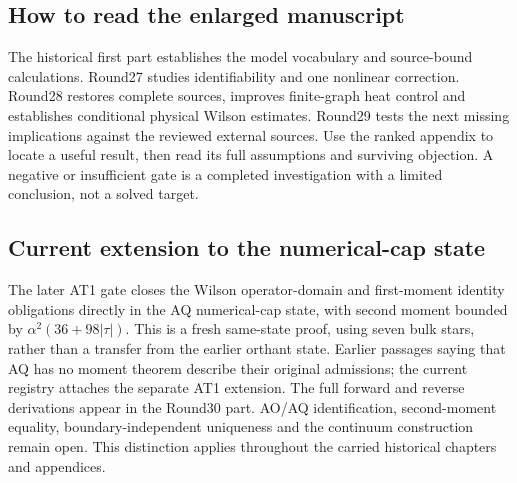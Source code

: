 \subsection{How to read the enlarged manuscript}
The historical first part establishes the model vocabulary and source-bound calculations. Round27 studies identifiability and one nonlinear correction. Round28 restores complete sources, improves finite-graph heat control and establishes conditional physical Wilson estimates. Round29 tests the next missing implications against the reviewed external sources. Use the ranked appendix to locate a useful result, then read its full assumptions and surviving objection. A negative or insufficient gate is a completed investigation with a limited conclusion, not a solved target.

\subsection{Current extension to the numerical-cap state}
The later AT1 gate closes the Wilson operator-domain and first-moment identity obligations directly in the AQ numerical-cap state, with second moment bounded by $\alpha^2(36+98|\tau|)$. This is a fresh same-state proof, using seven bulk stars, rather than a transfer from the earlier orthant state. Earlier passages saying that AQ has no moment theorem describe their original admissions; the current registry attaches the separate AT1 extension. The full forward and reverse derivations appear in the Round30 part. AO/AQ identification, second-moment equality, boundary-independent uniqueness and the continuum construction remain open. This distinction applies throughout the carried historical chapters and appendices.
